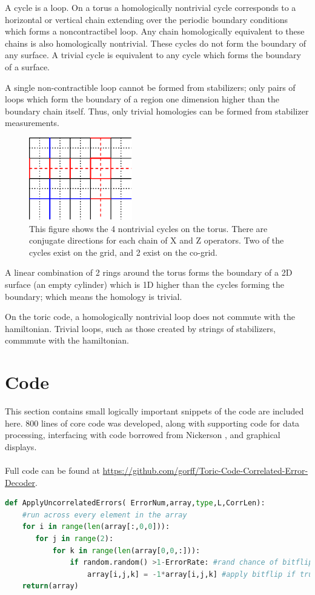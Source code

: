 		A cycle is a loop. On a torus a homologically nontrivial cycle corresponds to a horizontal or vertical chain extending over the periodic boundary conditions which forms a noncontractibel loop. Any chain homologically equivalent to these chains is also homologically nontrivial. These cycles do not form the boundary of any surface. A trivial cycle is equivalent to any cycle which forms the boundary of a surface. 
		
		A single non-contractible loop cannot be formed from stabilizers; only pairs of loops which form the boundary of a region one dimension higher than the boundary chain itself. Thus, only trivial homologies can be formed from stabilizer measurements. 
		\begin{figure}
		\centering
		\includegraphics[width = 0.4\textwidth]{figs/errors.eps}
		\caption{This figure shows the 4 nontrivial cycles on the torus. There are conjugate directions for each chain of X and Z operators. Two of the cycles exist on the grid, and 2 exist on the co-grid.}
		\label{fig:errors}
		\end{figure}
		A linear combination of 2 rings around the torus forms the boundary of a 2D surface (an empty cylinder) which is 1D higher than the cycles forming the boundary; which means the homology is trivial.
		
		On the toric code, a homologically nontrivial loop does not commute with the hamiltonian. Trivial loops, such as those created by strings of stabilizers, commmute with the hamiltonian. 
		
\section{Code}
	This section contains small logically important snippets of the code are included here. 800 lines of core code was developed, along with supporting code for data processing, interfacing with code borrowed from Nickerson \cite{Nickerson2014}, and graphical displays.	
	\\\\
	Full code can be found at \url{https://github.com/gorff/Toric-Code-Correlated-Error-Decoder}.
		
		\begin{lstlisting}[language=Python, caption=Applying Uncorrelated Errors, label = code:applyerrors]
def ApplyUncorrelatedErrors( ErrorNum,array,type,L,CorrLen):
	#run across every element in the array
	for i in range(len(array[:,0,0])):
	   for j in range(2):
	       for k in range(len(array[0,0,:])):
	           if random.random() >1-ErrorRate: #rand chance of bitflip
	               array[i,j,k] = -1*array[i,j,k] #apply bitflip if true
	return(array)
		\end{lstlisting}

